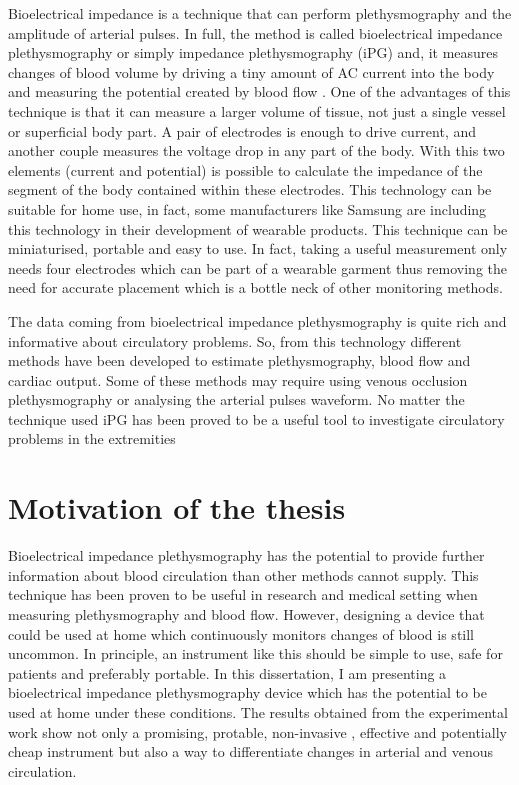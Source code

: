 Bioelectrical impedance is a technique that can perform plethysmography and the amplitude of arterial pulses. In full, the method is called bioelectrical impedance plethysmography or simply impedance plethysmography (iPG) and, it measures changes of blood volume by driving a tiny amount of AC current into the body and measuring the potential created by blood flow \cite{bera2014bioelectrical}. One of the advantages of this technique is that it can measure a larger volume of tissue, not just a single vessel or superficial body part. A pair of electrodes is enough to drive current, and another couple measures the voltage drop in any part of the body. With this two elements (current and potential) is possible to calculate the impedance of the segment of the body contained within these electrodes. This technology can be suitable for home use, in fact, some manufacturers like Samsung \cite{simsense} are including this technology in their development of wearable products. This technique can be miniaturised, portable and easy to use. In fact, taking a useful measurement only needs four electrodes which can be part of a wearable garment thus removing the need for accurate placement which is a bottle neck of other monitoring methods.

The data coming from bioelectrical impedance plethysmography is quite rich and informative about circulatory problems. So, from this technology different methods have been developed to estimate plethysmography, blood flow and cardiac output. Some of these methods may require using venous occlusion plethysmography or analysing the arterial pulses waveform. No matter the technique used iPG has been proved to be a useful tool to investigate circulatory problems in the extremities \cite{bera2014bioelectrical, nyboer1974blood, mohapatra1979measurement, kyle2004bioelectrical, costeloe1980continuous, yamakoshi1980limb, porter1985measurement, corciova2011peripheral}

\section{Motivation of the thesis}
Bioelectrical impedance plethysmography has the potential to provide further information about blood circulation than other methods cannot supply. This technique has been proven to be useful in research and medical setting when measuring plethysmography and blood flow. However, designing a device that could be used at home which continuously monitors changes of blood is still uncommon. In principle, an instrument like this should be simple to use, safe for patients and preferably portable. In this dissertation, I am presenting a bioelectrical impedance plethysmography device which has the potential to be used at home under these conditions. The results obtained from the experimental work show not only a promising, protable, non-invasive , effective and potentially cheap instrument but also a way to differentiate changes in arterial and venous circulation.   


